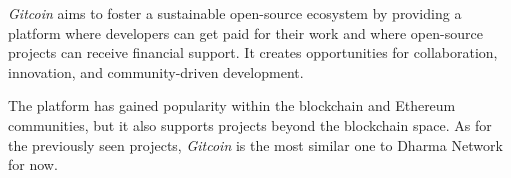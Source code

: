 \textit{Gitcoin} aims to foster a sustainable open-source ecosystem by providing a platform where developers can get paid for their work and where open-source projects can receive financial support. It creates opportunities for collaboration, innovation, and community-driven development.\newline

The platform has gained popularity within the blockchain and Ethereum communities, but it also supports projects beyond the blockchain space. As for the previously seen projects, \textit{Gitcoin} is the most similar one to Dharma Network for now.


	

